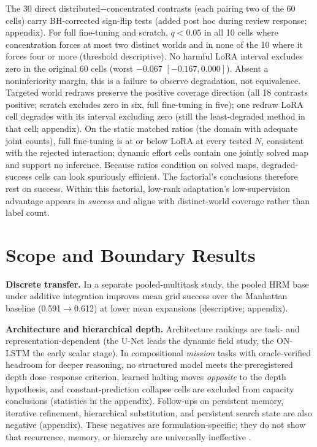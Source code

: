 \documentclass[letterpaper]{article} %
\begin{document}
The 30 direct distributed$-$concentrated contrasts (each pairing two of the 60 cells) carry BH-corrected sign-flip tests (added post hoc during review response; appendix). For full fine-tuning and scratch, $q{<}0.05$ in all 10 cells where concentration forces at most two distinct worlds and in none of the 10 where it forces four or more (threshold descriptive). No harmful LoRA interval excludes zero in the original 60 cells (worst $-0.067$ $[-0.167, 0.000]$). Absent a noninferiority margin, this is a failure to observe degradation, not equivalence. Targeted world redraws preserve the positive coverage direction (all 18 contrasts positive; scratch excludes zero in six, full fine-tuning in five); one redraw LoRA cell degrades with its interval excluding zero (still the least-degraded method in that cell; appendix). On the static matched ratios (the domain with adequate joint counts), full fine-tuning is at or below LoRA at every tested $N$, consistent with the rejected interaction; dynamic effort cells contain one jointly solved map and support no inference. Because ratios condition on solved maps, degraded-success cells can look spuriously efficient. The factorial's conclusions therefore rest on success. Within this factorial, low-rank adaptation's low-supervision advantage appears in \emph{success} and aligns with distinct-world coverage rather than label count.

\section{Scope and Boundary Results}

\textbf{Discrete transfer.} In a separate pooled-multitask study, the pooled HRM base under additive integration improves mean grid success over the Manhattan baseline (0.591$\to$0.612) at lower mean expansions (descriptive; appendix).

\textbf{Architecture and hierarchical depth.} Architecture rankings are task- and representation-dependent (the U-Net leads the dynamic field study, the ON-LSTM the early scalar stage). In compositional \emph{mission} tasks with oracle-verified headroom for deeper reasoning, no structured model meets the preregistered depth dose--response criterion, learned halting moves \emph{opposite} to the depth hypothesis, and constant-prediction collapse cells are excluded from capacity conclusions (statistics in the appendix). Follow-ups on persistent memory, iterative refinement, hierarchical substitution, and persistent search state are also negative (appendix). These negatives are formulation-specific; they do not show that recurrence, memory, or hierarchy are universally ineffective \citep{jolicoeur2025trm,czechowski2021subgoal}.
\end{document}
